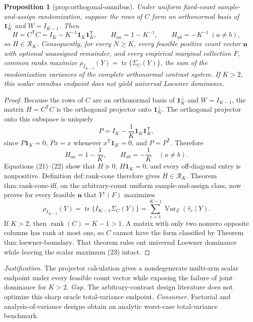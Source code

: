 \documentclass{article}
\newtheorem{proposition}{Proposition}
\begin{document}
\begin{proposition}[prop:orthogonal-omnibus]\label{prop:orthogonal-omnibus}
Under uniform fixed-count sample-and-assign randomization, suppose the rows of \(C\) form an orthonormal basis of \(\mathbf 1_K^{\perp}\) and \(W=I_{K-1}\).  Then
\[
H=C^{\mathsf T}C=I_K-K^{-1}\mathbf 1_K\mathbf 1_K^{\mathsf T},
\qquad H_{aa}=1-K^{-1},\qquad H_{ab}=-K^{-1}\ (a\ne b),
\]
so \(H\in\mathcal R_K\).  Consequently, for every \(N\geq K\), every feasible positive count vector \(\mathbf n\) with optional unassigned remainder, and every empirical marginal collection \(F\), common ranks maximize
\(\rho_{I_{K-1}}(Y)=\operatorname{tr}\{\Sigma_C(Y)\}\), the sum of the randomization variances of the complete orthonormal contrast system.  If \(K>2\), this scalar omnibus endpoint does not yield universal Loewner dominance.
\end{proposition}
\begin{proof}
Because the rows of \(C\) are an orthonormal basis of \(\mathbf 1_K^{\perp}\) and \(W=I_{K-1}\), the matrix \(H=C^{\mathsf T}C\) is the orthogonal projector onto \(\mathbf 1_K^{\perp}\).  The orthogonal projector onto this subspace is uniquely
\[
P=I_K-\frac1K\mathbf 1_K\mathbf 1_K^{\mathsf T}, \tag{21}
\]
since \(P\mathbf 1_K=0\), \(Px=x\) whenever \(x^{\mathsf T}\mathbf 1_K=0\), and \(P=P^{\mathsf T}\).  Therefore
\[
H_{aa}=1-\frac1K,
\qquad H_{ab}=-\frac1K\quad(a\ne b). \tag{22}
\]
Equations (21)--(22) show that \(H\succeq0\), \(H\mathbf 1_K=0\), and every off-diagonal entry is nonpositive.  Definition \(\mathrm{def{:}rank\text{-}cone}\) therefore gives \(H\in\mathcal R_K\).  Theorem \(\mathrm{thm{:}rank\text{-}cone\text{-}iff}\), on the arbitrary-count uniform sample-and-assign class, now proves for every feasible \(\mathbf n\) that \(Y^{\uparrow}(F)\) maximizes
\[
\rho_{I_{K-1}}(Y)=\operatorname{tr}\{I_{K-1}\Sigma_C(Y)\}
=\sum_{r=1}^{K-1}\operatorname{Var}_Z(\widehat\tau_r\mid Y). \tag{23}
\]
If \(K>2\), then \(\operatorname{rank}(C)=K-1>1\).  A matrix with only two nonzero opposite columns has rank at most one, so \(C\) cannot have the form classified by Theorem \(\mathrm{thm{:}loewner\text{-}boundary}\).  That theorem rules out universal Loewner dominance while leaving the scalar maximum (23) intact.
\end{proof}
\par\smallskip\noindent \textit{Justification.} The projector calculation gives a nondegenerate multi-arm scalar endpoint under every feasible count vector while exposing the failure of joint dominance for \(K>2\). \textit{Gap.} The arbitrary-contrast design literature does not optimize this sharp oracle total-variance endpoint. \textit{Consumer.} Factorial and analysis-of-variance designs obtain an analytic worst-case total-variance benchmark.
\end{document}
